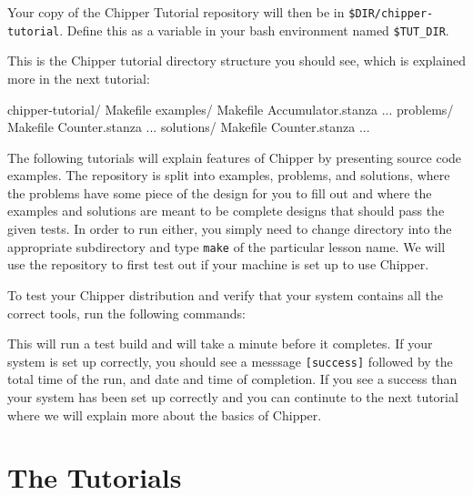 
\noindent
Your copy of the Chipper Tutorial repository will then be in \verb+$DIR/chipper-tutorial+.  Define this as a variable in your bash environment named \verb+$TUT_DIR+.

This is the Chipper tutorial directory structure you should see, which is explained more in the next tutorial:

\begin{bash}
chipper-tutorial/  
  Makefile
  examples/
    Makefile
    Accumulator.stanza ...
  problems/
    Makefile
    Counter.stanza ...
  solutions/
    Makefile
    Counter.stanza ...
\end{bash}

\noindent 

The following tutorials will explain features of Chipper by presenting source code examples.  The repository is split into examples, problems, and solutions, where the problems have some piece of the design for you to fill out and where the examples and solutions are meant to be complete designs that should pass the given tests.  In order to run either, you simply need to change directory into the appropriate subdirectory and type \verb+make+ of the particular lesson name. We will use the repository to first test out if your machine is set up to use Chipper.

To test your Chipper distribution and verify that your system contains all the correct tools, run the following commands:


This will run a test build and will take a minute before it completes. If your system is set up correctly, you should see a messsage \verb+[success]+ followed by the total time of the run, and date and time of completion. If you see a success than your system has been set up correctly and you can continute to the next tutorial where we will explain more about the basics of Chipper.

\section{The Tutorials}

